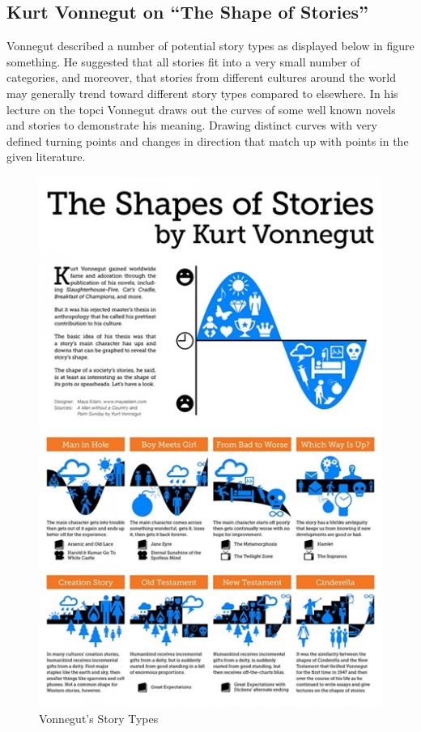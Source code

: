 \documentclass{article}
\begin{document}
    \subsection{Kurt Vonnegut on ``The Shape of Stories''}
        Vonnegut described a number of potential story types as displayed below in figure something. He suggested that all stories fit into a very small number of categories, and moreover, that stories from different cultures around the world may generally trend toward different story types compared to elsewhere. In his lecture on the topci Vonnegut draws out the curves of some well known novels and stories to demonstrate his meaning. Drawing distinct curves with very defined turning points and changes in direction that match up with points in the given literature.
        \begin{figure}
            \centering
            \includegraphics{Misc/VonnegutShapes}
            \caption{Vonnegut's Story Types}
            \label{fig:storyTypes}
        \end{figure}
\end{document}
